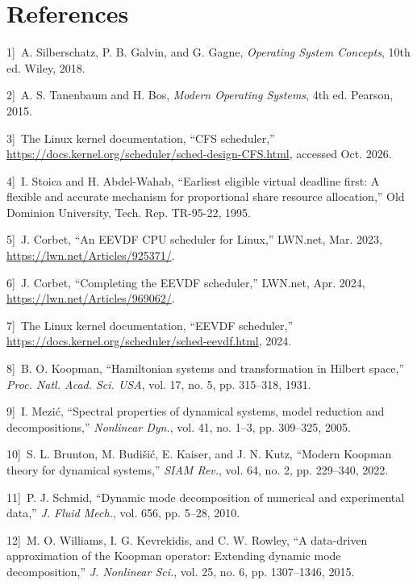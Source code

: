 \documentclass{article}
\begin{document}
\section*{References}

\noindent{}{[}1{]}~A. Silberschatz, P. B. Galvin, and G. Gagne, \emph{Operating System Concepts}, 10th ed. Wiley, 2018.

\noindent{}{[}2{]}~A. S. Tanenbaum and H. Bos, \emph{Modern Operating Systems}, 4th ed. Pearson, 2015.

\noindent{}{[}3{]}~{The Linux kernel documentation}, ``{CFS} scheduler,'' \url{https://docs.kernel.org/scheduler/sched-design-CFS.html}, accessed Oct. 2026.

\noindent{}{[}4{]}~I. Stoica and H. Abdel-Wahab, ``Earliest eligible virtual deadline first: A flexible and accurate mechanism for proportional share resource allocation,'' Old Dominion University, Tech. Rep. TR-95-22, 1995.

\noindent{}{[}5{]}~J. Corbet, ``An {EEVDF} {CPU} scheduler for {Linux},'' LWN.net, Mar. 2023, \url{https://lwn.net/Articles/925371/}.

\noindent{}{[}6{]}~J. Corbet, ``Completing the {EEVDF} scheduler,'' LWN.net, Apr. 2024, \url{https://lwn.net/Articles/969062/}.

\noindent{}{[}7{]}~{The Linux kernel documentation}, ``{EEVDF} scheduler,'' \url{https://docs.kernel.org/scheduler/sched-eevdf.html}, 2024.

\noindent{}{[}8{]}~B. O. Koopman, ``Hamiltonian systems and transformation in {Hilbert} space,'' \emph{Proc. Natl. Acad. Sci. USA}, vol. 17, no. 5, pp. 315--318, 1931.

\noindent{}{[}9{]}~I. Mezi\'c, ``Spectral properties of dynamical systems, model reduction and decompositions,'' \emph{Nonlinear Dyn.}, vol. 41, no. 1--3, pp. 309--325, 2005.

\noindent{}{[}10{]}~S. L. Brunton, M. Budi\v{s}i\'c, E. Kaiser, and J. N. Kutz, ``Modern {Koopman} theory for dynamical systems,'' \emph{SIAM Rev.}, vol. 64, no. 2, pp. 229--340, 2022.

\noindent{}{[}11{]}~P. J. Schmid, ``Dynamic mode decomposition of numerical and experimental data,'' \emph{J. Fluid Mech.}, vol. 656, pp. 5--28, 2010.

\noindent{}{[}12{]}~M. O. Williams, I. G. Kevrekidis, and C. W. Rowley, ``A data-driven approximation of the {Koopman} operator: Extending dynamic mode decomposition,'' \emph{J. Nonlinear Sci.}, vol. 25, no. 6, pp. 1307--1346, 2015.
\end{document}
